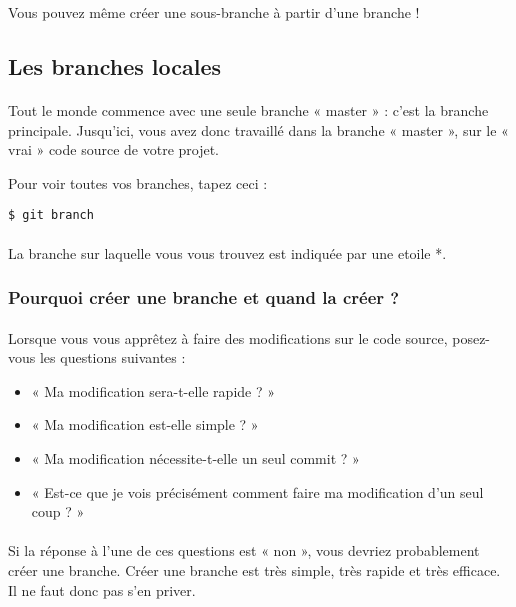 \documentclass[french, a4paper, 12pt, titlepage]{article}
\begin{document}
Vous pouvez même créer une sous-branche à partir d’une branche !


\subsection{Les branches locales}
\paragraph{}Tout le monde commence avec une seule branche « master » : c’est la branche principale. Jusqu’ici, vous avez donc travaillé dans la branche « master », sur le « vrai » code source de votre projet.

Pour voir toutes vos branches, tapez ceci :
\begin{lstlisting}
$ git branch
\end{lstlisting}

\paragraph{}La branche sur laquelle vous vous trouvez est indiquée par une etoile *.

\subsubsection{Pourquoi créer une branche et quand la créer ?}
\paragraph{}Lorsque vous vous apprêtez à faire des modifications sur le code source, posez-vous les questions suivantes :
\begin{itemize}
\item « Ma modification sera-t-elle rapide ? »
\item « Ma modification est-elle simple ? » 
\item « Ma modification nécessite-t-elle un seul commit ? »
\item « Est-ce que je vois précisément comment faire ma modification d’un seul coup ? »
\end{itemize}

\paragraph{}Si la réponse à l’une de ces questions est « non », vous devriez probablement créer une branche. Créer une branche est très simple, très rapide et très efficace. Il ne faut donc pas s’en priver.
\end{document}
